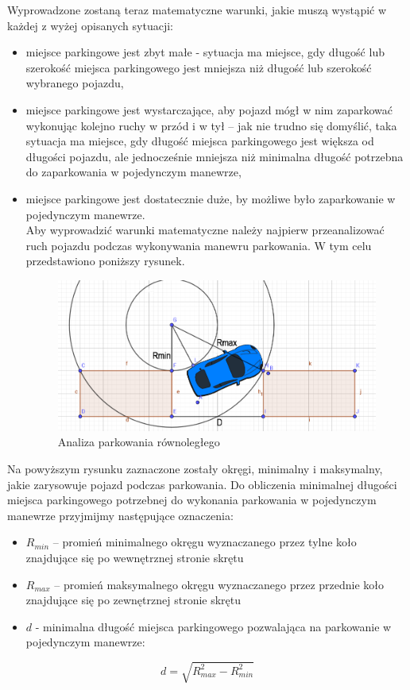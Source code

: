 \documentclass[a4paper,11pt,twoside]{report}
\theoremstyle{definition}
\begin{document}
Wyprowadzone zostaną teraz matematyczne warunki, jakie muszą wystąpić w każdej z wyżej opisanych sytuacji:
\begin{itemize}
	\item miejsce parkingowe jest zbyt małe - sytuacja ma miejsce, gdy długość lub szerokość miejsca parkingowego jest mniejsza niż długość lub szerokość wybranego pojazdu,
	\item miejsce parkingowe jest wystarczające, aby pojazd mógł w nim zaparkować wykonując kolejno ruchy w przód i w tył – jak nie trudno się domyślić, taka sytuacja ma miejsce, gdy długość miejsca parkingowego jest większa od długości pojazdu, ale jednocześnie mniejsza niż minimalna długość potrzebna do zaparkowania w pojedynczym manewrze,
	\item miejsce parkingowe jest dostatecznie duże, by możliwe było zaparkowanie w pojedynczym manewrze. 
	~\\Aby wyprowadzić warunki matematyczne należy najpierw przeanalizować ruch pojazdu podczas wykonywania manewru parkowania. W tym celu przedstawiono poniższy rysunek.
	
\begin{figure}[h!]
\centering
\includegraphics[scale=0.4]{vehicleParallelParkingAnalysis}
\caption[Analiza parkowania równoległego]{Analiza parkowania równoległego}
\end{figure}
	
\end{itemize}

Na powyższym rysunku zaznaczone zostały okręgi, minimalny i maksymalny, jakie zarysowuje pojazd podczas parkowania. Do obliczenia minimalnej długości miejsca parkingowego potrzebnej do wykonania parkowania w pojedynczym manewrze przyjmijmy następujące oznaczenia:
\begin{itemize}
\item $R_{min}$ – promień minimalnego okręgu wyznaczanego przez tylne koło znajdujące się po wewnętrznej stronie skrętu
\item $R_{max}$ – promień maksymalnego okręgu wyznaczanego przez przednie koło znajdujące się po zewnętrznej stronie skrętu
\item $d$ - minimalna długość miejsca parkingowego pozwalająca na parkowanie w pojedynczym manewrze:
\end{itemize}
$$
d = \sqrt{R^{2}_{max} - R^{2}_{min}}
$$
\end{document}
